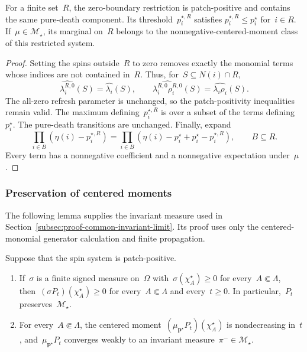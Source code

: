\documentclass[EJP,preprint,NODS,nobera]{ejpecp}
\newcommand{\bb}[1]{\left(#1\right)}
\newcommand{\mb}[1]{\mathbf{#1}}
\newcommand{\rev}[1]{{\color{red}#1}}
\begin{document}
{\color{red}
\begin{lemma}
\label{lem:zero-boundary-compatibility}
For a finite set~$R$, the zero-boundary restriction is patch-positive and
contains the same pure-death component. Its threshold~$p_i^{\star,R}$ satisfies
$p_i^{\star,R}\leq p_i^\star$ for~$i\in R$.
If~$\mu\in\mathcal M_\star$, its marginal on~$R$ belongs to the
nonnegative-centered-moment class of this restricted system.
\end{lemma}
}

{\color{red}
\begin{proof}
Setting the spins outside~$R$ to zero removes exactly the monomial terms
whose indices are not contained in~$R$. Thus, for~$S\subseteq N(i)\cap R$,
\begin{equation*}
\widehat{\lambda_i^{R,0}}(S)=\widehat{\lambda_i}(S),
\qquad
\widehat{\lambda_i^{R,0}\rho_i^{R,0}}(S)
=\widehat{\lambda_i\rho_i}(S).
\end{equation*}
The all-zero refresh parameter is unchanged, so the patch-positivity
inequalities remain valid. The maximum defining~$p_i^{\star,R}$ is over a
subset of the terms defining~$p_i^\star$. The pure-death transitions are
unchanged. Finally, expand
\begin{equation*}
\prod_{i\in B}\bb{\eta(i)-p_i^{\star,R}}
=\prod_{i\in B}
\bb{\eta(i)-p_i^\star+p_i^\star-p_i^{\star,R}},
\qquad B\subseteq R.
\end{equation*}
Every term has a nonnegative coefficient and a nonnegative expectation under~$\mu$.
\end{proof}
}

\subsubsection{\texorpdfstring{\rev{Preservation of centered moments}}{Preservation of centered moments}}
\label{subsec:centered-moments-proof}

{\color{red}
The following lemma supplies the invariant measure used in
Section~\ref{subsec:proof-common-invariant-limit}. Its proof uses only the
centered-monomial generator calculation and finite propagation.
}

\begin{lemma}
\label{lem:centered-cone-preservation}
\label{lem:threshold-product-limit}
Suppose that the spin system is patch-positive.
\begin{enumerate}[label=\textup{(\alph*)}]

\item If~$\sigma$ is a finite signed measure on~$\Omega$
with~$\sigma(\chi_A^\star)\geq0$ for every~$A\Subset\Lambda$,
then~$(\sigma P_t)(\chi_A^\star)\geq0$ for every~$A\Subset\Lambda$ and
every~$t\geq0$. In particular,~$P_t$ preserves~$\mathcal M_\star$.

\item For every~$A\Subset\Lambda$, the centered
moment~$(\mu_{\mb p^\star}P_t)(\chi_A^\star)$ is nondecreasing in~$t$,
and~$\mu_{\mb p^\star}P_t$ converges weakly to an invariant
measure~$\pi^-\in\mathcal M_\star$.

\end{enumerate}
\end{lemma}
\end{document}
